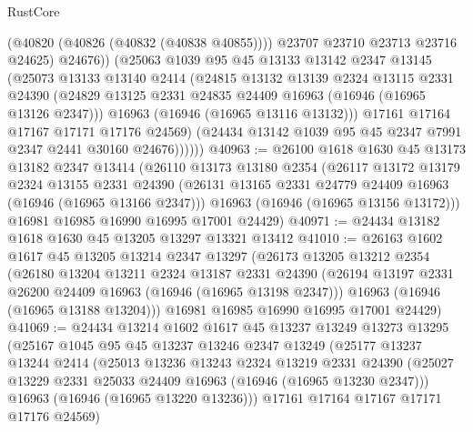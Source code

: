 \begin{lexlean}{RustCore}
\begin{coremodule}
                  (@40820 (@40826 (@40832 (@40838 @40855))))
                  @23707
                  @23710
                  @23713
                  @23716
                  @24625)
                @24676))
            (@25063
              @1039
              @95
              @45
              @13133
              @13142
              @2347
              @13145
              (@25073
                @13133
                @13140
                @2414
                (@24815
                  @13132
                  @13139
                  @2324
                  @13115
                  @2331
                  @24390
                  (@24829 @13125 @2331 @24835 @24409 @16963 (@16946 (@16965 @13126 @2347)))
                  @16963
                  (@16946 (@16965 @13116 @13132)))
                @17161
                @17164
                @17167
                @17171
                @17176
                @24569)
              (@24434 @13142 @1039 @95 @45 @2347 @7991 @2347 @2441 @30160 @24676))))))
@40963 := @26100
    @1618
    @1630
    @45
    @13173
    @13182
    @2347
    @13414
    (@26110
      @13173
      @13180
      @2354
      (@26117
        @13172
        @13179
        @2324
        @13155
        @2331
        @24390
        (@26131 @13165 @2331 @24779 @24409 @16963 (@16946 (@16965 @13166 @2347)))
        @16963
        (@16946 (@16965 @13156 @13172)))
      @16981
      @16985
      @16990
      @16995
      @17001
      @24429)
@40971 := @24434 @13182 @1618 @1630 @45 @13205 @13297 @13321 @13412
@41010 := @26163
    @1602
    @1617
    @45
    @13205
    @13214
    @2347
    @13297
    (@26173
      @13205
      @13212
      @2354
      (@26180
        @13204
        @13211
        @2324
        @13187
        @2331
        @24390
        (@26194 @13197 @2331 @26200 @24409 @16963 (@16946 (@16965 @13198 @2347)))
        @16963
        (@16946 (@16965 @13188 @13204)))
      @16981
      @16985
      @16990
      @16995
      @17001
      @24429)
@41069 := @24434
    @13214
    @1602
    @1617
    @45
    @13237
    @13249
    @13273
    @13295
    (@25167
      @1045
      @95
      @45
      @13237
      @13246
      @2347
      @13249
      (@25177
        @13237
        @13244
        @2414
        (@25013
          @13236
          @13243
          @2324
          @13219
          @2331
          @24390
          (@25027 @13229 @2331 @25033 @24409 @16963 (@16946 (@16965 @13230 @2347)))
          @16963
          (@16946 (@16965 @13220 @13236)))
        @17161
        @17164
        @17167
        @17171
        @17176
        @24569)

\end{coremodule}
\end{lexlean}
